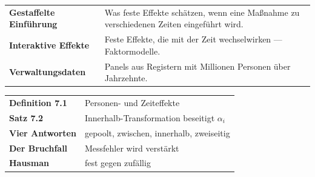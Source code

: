 \begin{forschung}
\begin{center}
{\small
\renewcommand{\arraystretch}{1.45}
\begin{tabular}{@{}P{3.2cm}P{5.0cm}@{}}
\toprule
\textbf{Gestaffelte Einführung} & Was feste Effekte schätzen, wenn eine Maßnahme zu verschiedenen Zeiten eingeführt wird.\\
\textbf{Interaktive Effekte} & Feste Effekte, die mit der Zeit wechselwirken --- Faktormodelle.\\
\textbf{Verwaltungsdaten} & Panels aus Registern mit Millionen Personen über Jahrzehnte.\\
\bottomrule
\end{tabular}}
\end{center}

\begin{center}
\begin{minipage}{0.88\textwidth}
\end{minipage}
\end{center}
\end{forschung}

\begin{merksatz}
\begin{center}
\renewcommand{\arraystretch}{1.5}
\begin{tabular}{@{}P{3.0cm}P{5.6cm}@{}}
\toprule
\textbf{Definition 7.1} & Personen- und Zeiteffekte\\
\textbf{Satz 7.2} & Innerhalb-Transformation beseitigt $\alpha_i$\\
\textbf{Vier Antworten} & gepoolt, zwischen, innerhalb, zweiseitig\\
\textbf{Der Bruchfall} & Messfehler wird verstärkt\\
\textbf{Hausman} & fest gegen zufällig\\
\bottomrule
\end{tabular}
\end{center}

\begin{center}
\begin{minipage}{0.88\textwidth}
\end{minipage}
\end{center}
\end{merksatz}
